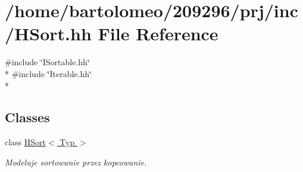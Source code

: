 \hypertarget{_h_sort_8hh}{\section{/home/bartolomeo/209296/prj/inc/\-H\-Sort.hh File Reference}
\label{_h_sort_8hh}
}
{\ttfamily \#include \char`\"{}I\-Sortable.\-hh\char`\"{}}\\*
{\ttfamily \#include \char`\"{}Iterable.\-hh\char`\"{}}\\*
\subsection*{Classes}
\begin{DoxyCompactItemize}
\item 
class \hyperlink{class_h_sort}{H\-Sort$<$ Typ $>$}
\begin{DoxyCompactList}\small\item\em Modeluje sortowanie przez kopcowanie. \end{DoxyCompactList}\end{DoxyCompactItemize}
